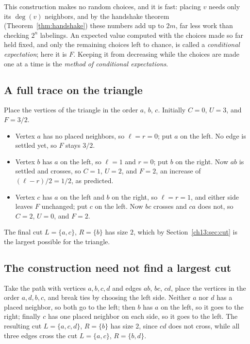 This construction makes no random choices, and it is fast: placing $v$ needs only its $\deg(v)$ neighbors, and by the handshake theorem (Theorem~\ref{thm:handshake}) these numbers add up to $2m$, far less work than checking $2^n$ labelings. An expected value computed with the choices made so far held fixed, and only the remaining choices left to chance, is called a \emph{conditional expectation}; here it is $F$. Keeping it from decreasing while the choices are made one at a time is the \emph{method of conditional expectations}.

\subsection*{A full trace on the triangle}
Place the vertices of the triangle in the order $a$, $b$, $c$. Initially $C=0$, $U=3$, and $F=3/2$.
\begin{itemize}
\item Vertex $a$ has no placed neighbors, so $\ell=r=0$; put $a$ on the left. No edge is settled yet, so $F$ stays $3/2$.
\item Vertex $b$ has $a$ on the left, so $\ell=1$ and $r=0$; put $b$ on the right. Now $ab$ is settled and crosses, so $C=1$, $U=2$, and $F=2$, an increase of $(\ell-r)/2=1/2$, as predicted.
\item Vertex $c$ has $a$ on the left and $b$ on the right, so $\ell=r=1$, and either side leaves $F$ unchanged; put $c$ on the left. Now $bc$ crosses and $ca$ does not, so $C=2$, $U=0$, and $F=2$.
\end{itemize}
The final cut $L=\{a,c\}$, $R=\{b\}$ has size $2$, which by Section~\ref{ch13:sec:cut} is the largest possible for the triangle.

\subsection*{The construction need not find a largest cut}
Take the path with vertices $a,b,c,d$ and edges $ab$, $bc$, $cd$, place the vertices in the order $a,d,b,c$, and break ties by choosing the left side. Neither $a$ nor $d$ has a placed neighbor, so both go to the left; then $b$ has $a$ on the left, so it goes to the right; finally $c$ has one placed neighbor on each side, so it goes to the left. The resulting cut $L=\{a,c,d\}$, $R=\{b\}$ has size $2$, since $cd$ does not cross, while all three edges cross the cut $L=\{a,c\}$, $R=\{b,d\}$.
